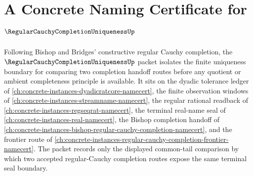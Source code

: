\chapter{A Concrete Naming Certificate for $\RegularCauchyCompletionUniquenessUp$}
\label{ch:concrete-instances-regular-cauchy-completion-uniqueness-namecert}

Following Bishop and Bridges' constructive regular Cauchy completion, the $\RegularCauchyCompletionUniquenessUp$ packet isolates the finite uniqueness boundary for comparing two completion handoff routes before any quotient or ambient completeness principle is available. It sits on the dyadic tolerance ledger of \autoref{ch:concrete-instances-dyadicratcore-namecert}, the finite observation windows of \autoref{ch:concrete-instances-streamname-namecert}, the regular rational readback of \autoref{ch:concrete-instances-regseqrat-namecert}, the terminal real-name seal of \autoref{ch:concrete-instances-real-namecert}, the Bishop completion handoff of \autoref{ch:concrete-instances-bishop-regular-cauchy-completion-namecert}, and the frontier route of \autoref{ch:concrete-instances-regular-cauchy-completion-frontier-namecert}. The packet records only the displayed common-tail comparison by which two accepted regular-Cauchy completion routes expose the same terminal seal boundary.

